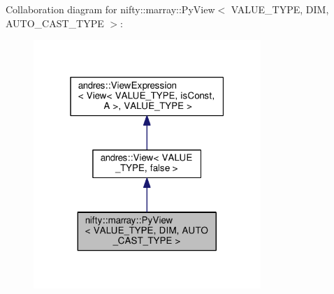 Collaboration diagram for nifty\+:\+:marray\+:\+:Py\+View$<$ V\+A\+L\+U\+E\+\_\+\+T\+Y\+P\+E, D\+I\+M, A\+U\+T\+O\+\_\+\+C\+A\+S\+T\+\_\+\+T\+Y\+P\+E $>$\+:\nopagebreak
\begin{figure}[H]
\begin{center}
\leavevmode
\includegraphics[width=244pt]{classnifty_1_1marray_1_1PyView__coll__graph}
\end{center}
\end{figure}
